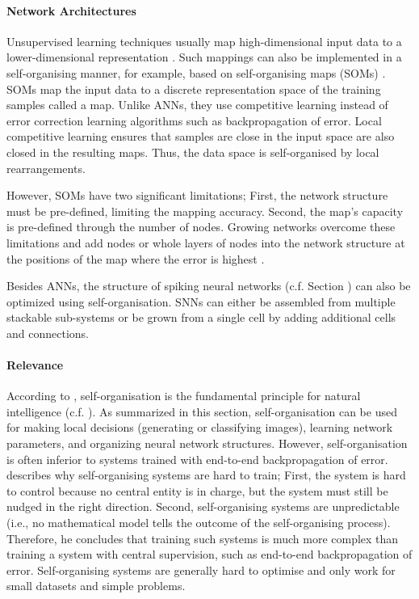 \paragraph{Network Architectures}
Unsupervised learning techniques usually map high-dimensional input data to a lower-dimensional representation \cite{russell_artificial_2021}. Such mappings can also be implemented in a self-organising manner, for example, based on self-organising maps (SOMs) .
SOMs map the input data to a discrete representation space of the training samples called a map.
Unlike ANNs, they use competitive learning instead of error correction learning algorithms such as backpropagation of error.
Local competitive learning ensures that samples are close in the input space are also closed in the resulting maps.
Thus, the data space is self-organised by local rearrangements.

However, SOMs have two significant limitations; First, the network structure must be pre-defined, limiting the mapping accuracy. Second, the map's capacity is pre-defined through the number of nodes.
Growing networks overcome these limitations and add nodes or whole layers of nodes into the network structure at the positions of the map where the error is highest .

Besides ANNs, the structure of spiking neural networks (c.f. Section ) can also be optimized using self-organisation. 
SNNs can either be assembled from multiple stackable sub-systems 
or be grown from a single cell  by adding additional cells and connections.


\paragraph{Relevance}
According to , self-organisation is the fundamental principle for natural intelligence (c.f. ).
As summarized in this section, self-organisation can be used for making local decisions (generating or classifying images), learning network parameters, and organizing neural network structures.
However, self-organisation is often inferior to systems trained with end-to-end backpropagation of error.
 describes why self-organising systems are hard to train;
First, the system is hard to control because no central entity is in charge, but the system must still be nudged in the right direction.
Second, self-organising systems are unpredictable (i.e., no mathematical model tells the outcome of the self-organising process).
Therefore, he concludes that training such systems is much more complex than training a system with central supervision, such as end-to-end backpropagation of error.
Self-organising systems are generally hard to optimise and only work for small datasets and simple problems.









